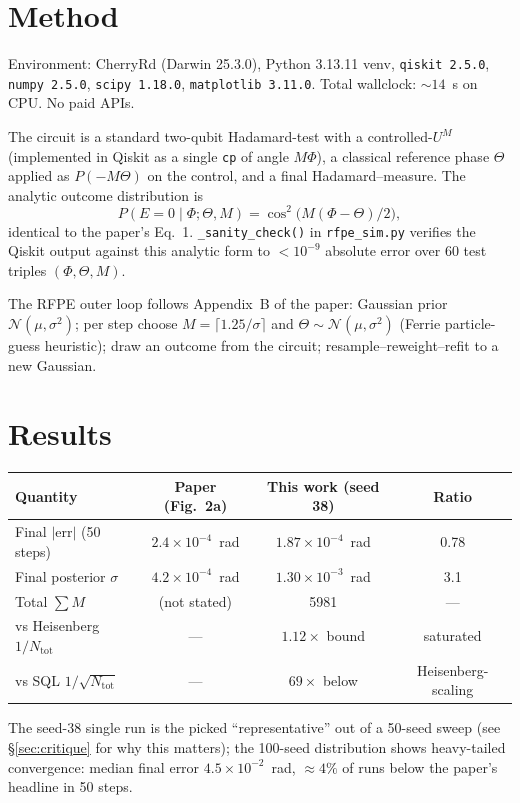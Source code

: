 \documentclass[11pt]{article}
\begin{document}
\section{Method}
Environment: CherryRd (Darwin 25.3.0), Python 3.13.11 venv, \texttt{qiskit
2.5.0}, \texttt{numpy 2.5.0}, \texttt{scipy 1.18.0}, \texttt{matplotlib
3.11.0}.  Total wallclock: $\sim 14$~s on CPU.  No paid APIs.

The circuit is a standard two-qubit Hadamard-test with a controlled-$U^M$
(implemented in Qiskit as a single \texttt{cp} of angle $M\Phi$), a classical
reference phase $\Theta$ applied as $P(-M\Theta)$ on the control, and a final
Hadamard--measure.  The analytic outcome distribution is
\begin{equation}
  P(E=0\mid\Phi;\Theta,M) = \cos^2\!\bigl(M(\Phi-\Theta)/2\bigr),
\end{equation}
identical to the paper's Eq.~1.  \texttt{\_sanity\_check()} in
\texttt{rfpe\_sim.py} verifies the Qiskit output against this analytic form to
$<10^{-9}$ absolute error over 60 test triples $(\Phi,\Theta,M)$.

The RFPE outer loop follows Appendix~B of the paper: Gaussian
prior $\mathcal{N}(\mu,\sigma^2)$; per step choose $M=\lceil 1.25/\sigma\rceil$
and $\Theta\sim\mathcal{N}(\mu,\sigma^2)$ (Ferrie particle-guess heuristic);
draw an outcome from the circuit; resample--reweight--refit to a new Gaussian.

\section{Results}
\begin{center}
\begin{tabular}{lccc}
\toprule
Quantity & Paper (Fig.~2a) & This work (seed 38) & Ratio \\
\midrule
Final $|$err$|$ (50 steps) & $2.4\times10^{-4}$~rad & $1.87\times10^{-4}$~rad & 0.78 \\
Final posterior $\sigma$   & $4.2\times10^{-4}$~rad & $1.30\times10^{-3}$~rad & 3.1 \\
Total $\sum M$             & (not stated)          & 5981                    & --- \\
vs Heisenberg $1/N_{\text{tot}}$ & --- & $1.12\times$ bound & saturated \\
vs SQL $1/\sqrt{N_{\text{tot}}}$ & --- & $69\times$ below   & Heisenberg-scaling \\
\bottomrule
\end{tabular}
\end{center}
The seed-38 single run is the picked ``representative'' out of a 50-seed sweep
(see \S\ref{sec:critique} for why this matters); the 100-seed distribution
shows heavy-tailed convergence: median final error $4.5\times10^{-2}$~rad,
$\approx4\%$ of runs below the paper's headline in 50 steps.
\end{document}

